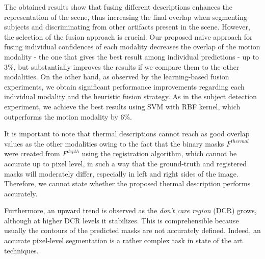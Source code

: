 \documentclass[10pt,twocolumn,letterpaper]{article}
\begin{document}
The obtained results show that fusing different descriptions enhances the representation of the scene, thus increasing the final overlap when segmenting subjects and discriminating from other artifacts present in the scene. However, the selection of the fusion approach is crucial. Our proposed naive approach for fusing individual confidences of each modality decreases the overlap of the motion modality - the one that gives the best result among individual predictions - up to 3\%, but substantially improves the results if we compare them to the other modalities. On the other hand, as observed by the learning-based fusion experiments, we obtain significant performance improvements regarding each individual modality and the heuristic fusion strategy. As in the subject detection experiment, we achieve the best results using SVM with RBF kernel, which outperforms the motion modality by 6\%.

It is important to note that thermal descriptions cannot reach as good overlap values as the other modalities owing to the fact that the binary masks $F^{thermal}$ were created from $F^{depth}$ using the registration algorithm, which cannot be accurate up to pixel level, in such a way that the ground-truth and registered masks will moderately differ, especially in left and right sides of the image. Therefore, we cannot state whether the proposed thermal description performs accurately.

Furthermore, an upward trend is observed as the \emph{don't care region} (DCR) grows, although at higher DCR levels it stabilizes. This is comprehensible because usually the contours of the predicted masks are not accurately defined. Indeed, an accurate pixel-level segmentation is a rather complex task in state of the art techniques.
\end{document}
